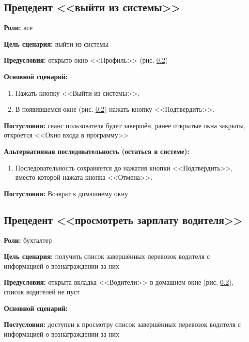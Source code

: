 \subsection{Прецедент <<выйти из системы>>}
\textbf{Роли:} все \par
\textbf{Цель сценария:} выйти из системы \par
\textbf{Предусловия:} открыто окно <<Профиль>> (рис. \ref{}) \par
\textbf{Основной сценарий:} 
\begin{enumerate}
    \item Нажать кнопку <<Выйти из системы>>;
    \item В появившемся окне (рис. \ref{}) нажать кнопку <<Подтвердить>>.
\end{enumerate} \par
\textbf{Постусловия:} сеанс пользователя будет завершён, 
    ранее открытые окна закрыты, откроется <<Окно входа в программу>> \par
\textbf{Альтернативная последовательность (остаться в системе):} \par
\begin{enumerate}
    \item Последовательность сохраняется до нажатия кнопки <<Подтвердить>>, 
        вместо которой нажата кнопка <<Отмена>>.
\end{enumerate} \par
\textbf{Постусловия:} Возврат к домашнему окну \par

\subsection{Прецедент <<просмотреть зарплату водителя>>}
\textbf{Роли:} бухгалтер \par
\textbf{Цель сценария:} получить список завершённых перевозок водителя 
    с информацией о вознаграждении за них \par
\textbf{Предусловия:} открыта вкладка <<Водители>> 
    в домашнем окне (рис. \ref{}), список водителей не пуст \par
\textbf{Основной сценарий:} 
 \par
\textbf{Постусловия:} доступен к просмотру список завершённых 
    перевозок водителя с информацией о вознаграждении за них \par

